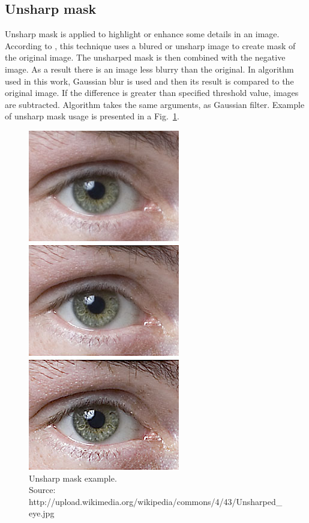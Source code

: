 \documentclass[a4paper,onecolumn,oneside,12pt]{memoir}
\begin{document}
\subsection{Unsharp mask}

Unsharp mask is applied to highlight or enhance some details in an image. According to 
\cite{unsharpMaskWiki}, this technique uses a blured or unsharp image to create mask of the original
image. The unsharped mask is then combined with the negative image. As a result there is an image
less blurry than the original. In algorithm used in this work, Gaussian blur is used and then its
result is compared to the original image. If the difference is greater than specified threshold
value, images are subtracted. Algorithm takes the same arguments, as Gaussian filter. Example of
unsharp mask usage is presented in a Fig.~\ref{unsharpMaskExample}.

\begin{figure}[ht]
\begin{center}
\includegraphics[scale=1.2]{images/unsharpMaskExample.jpg}
\caption{Unsharp mask example. \\
Source: http://upload.wikimedia.org/wikipedia/commons/4/43/Unsharped\_eye.jpg}
\label{unsharpMaskExample}
\end{center}
\end{figure}
\end{document}
